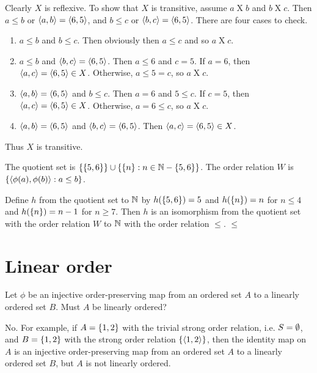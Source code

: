 \begin{solution}
Clearly $X$ is reflexive. To show that $X$ is transitive, assume $a\mathrel X b$
and $b\mathrel X c$.
Then $a\leq b$ or $\left\langle a,b\right\rangle=\left\langle6,5\right\rangle$, and $b\leq c$ or $\left\langle b,c\right\rangle=\left\langle6,5\right\rangle$.
There are four cases to check.
\begin{enumerate}
    \item $a\leq b$ and $b\leq c$. Then obviously then $a\leq c$ and so $a\mathrel X c$.
    \item $a\leq b$ and $\left\langle b,c\right\rangle=\left\langle6,5\right\rangle$. Then $a\leq 6$ and $c=5$. If $a=6$,
    then $\left\langle a,c\right\rangle=\left\langle6,5\right\rangle\in X$. Otherwise, $a\leq 5 =c$, so $a\mathrel X c$.
    \item $\left\langle a,b\right\rangle=\left\langle6,5\right\rangle$ and $b\leq c$. Then $a=6$ and $5\leq c$. If $c=5$,
    then $\left\langle a,c\right\rangle=\left\langle6,5\right\rangle\in X$. Otherwise, $a= 6 \leq c$, so $a\mathrel X c$.
    \item $\left\langle a,b\right\rangle=\left\langle6,5\right\rangle$ and $\left\langle b,c\right\rangle=\left\langle6,5\right\rangle$. Then $\left\langle a,c\right\rangle=\left\langle6,5\right\rangle\in X$.
\end{enumerate}
Thus $X$ is transitive.

The quotient set is $\left\{\left\{5,6\right\}\right\}\cup\left\{ \left\{n\right\} : n\in\mathbb{N} - \left\{5,6\right\} \right\}$.
The order relation $W$ is $\left\{ \left\langle\phi(a),\phi(b)\right\rangle : a\leq b \right\}$.

Define $h$ from the quotient set to $\mathbb{N}$ by $h(\left\{5,6\right\})=5$ and $h(\left\{n\right\})=n$ for $n\leq 4$
and $h(\left\{n\right\})=n-1$ for $n\geq 7$. Then $h$ is an isomorphism from the quotient set
with the order relation $W$ to $\mathbb{N}$ with the order relation $\leq$. $\leqslant$
\end{solution}


\section{Linear order}
\begin{exercise}
Let $\phi$ be an injective order-preserving map from an ordered set $A$ to a linearly
ordered set $B$. Must $A$ be linearly ordered?
\end{exercise}

\begin{solution}
No. For example, if $A=\left\{1,2\right\}$ with the trivial strong order relation, i.e. $S=\emptyset$,
and $B=\left\{1,2\right\}$ with the strong order relation $\left\{\left\langle1,2\right\rangle\right\}$, then the identity map on $A$
is an injective order-preserving map from an ordered set $A$ to a linearly
ordered set $B$, but $A$ is not linearly ordered.
\end{solution}

